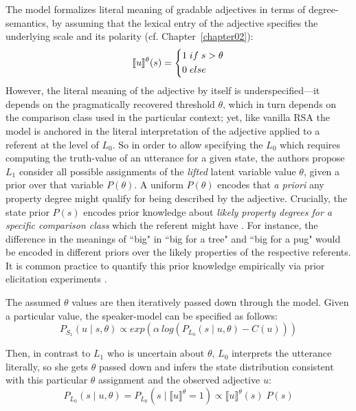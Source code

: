The model formalizes literal meaning of gradable adjectives in terms of degree-semantics, by assuming that the lexical entry of the adjective specifies the underlying scale and its polarity (cf. Chapter~\ref{chapter02}):
\[
\llbracket u \rrbracket^{\theta} (s) =
\begin{dcases}
1 \; if \;  s > \theta \\
0 \; else
\end{dcases}
\]
However, the literal meaning of the adjective by itself is underspecified---it depends on the pragmatically recovered threshold $\theta$, which in turn depends on the comparison class used in the particular context; yet, like vanilla RSA the model is anchored in the literal interpretation of the adjective applied to a referent at the level of $L_0$.  
So in order to allow specifying the $L_0$ which requires computing the truth-value of an utterance for a given state, the authors propose $L_1$ consider all possible assignments of the \emph{lifted} latent variable value $\theta$, given a prior over that variable $P(\theta)$. A uniform $P(\theta)$ encodes that \emph{a priori} any property degree might qualify for being described by the adjective. Crucially, the state prior $P(s)$ encodes prior knowledge about \emph{likely property degrees for a specific comparison class} which the referent might have \parencite{lassiter2013context}. For instance, the difference in the meanings of ``big" in ``big for a tree" and ``big for a pug" would be encoded in different priors over the likely properties of the respective referents. It is common practice to quantify this prior knowledge empirically via prior elicitation experiments \parencite{problang}.

The assumed $\theta$ values are then iteratively passed down through the model. Given a particular value, the speaker-model can be specified as follows:
\begin{equation}
	P_{S_1} (u \mid s, \theta) \propto exp(\alpha \: log (P_{L_0} (s \mid u, \theta) - C(u)) )
\end{equation}	

Then, in contrast to $L_1$ who is uncertain about $\theta$, $L_0$ interprets the utterance literally, so she gets $\theta$ passed down and infers the state distribution consistent with this particular $\theta$ assignment and the observed adjective $u$:
\begin{equation}
P_{L_0} (s \mid u, \theta) = P_{L_0} (s \mid \llbracket u \rrbracket ^\theta = 1 ) \propto \llbracket u \rrbracket ^\theta (s) \; P(s)
\end{equation}


